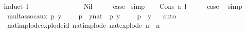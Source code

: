 \begin{isabellebody}
%
\isadelimproof
%
\endisadelimproof
%
\isatagproof
{}\isamarkupfalse%
{\isacharparenleft}{\kern0pt}induct\ {\isacartoucheopen}l{\isacartoucheclose}{\isacharparenright}{\kern0pt}\ \ \ \ \ \ \ \ \ \ \ \ \isanewline
\ \ \isamarkupfalse%
\ Nil\isanewline
\ \ \isamarkupfalse%
\ \isamarkupfalse%
\ {\isacharquery}{\kern0pt}case\ \isamarkupfalse%
{\isacharparenleft}{\kern0pt}simp{\isacharparenright}{\kern0pt}\isanewline
{}\isamarkupfalse%
\isanewline
\ \ \isamarkupfalse%
\ {\isacharparenleft}{\kern0pt}Cons\ a\ l{\isacharparenright}{\kern0pt}\isanewline
\ \ \isamarkupfalse%
\ \isamarkupfalse%
\ {\isacharquery}{\kern0pt}case\ \ \isamarkupfalse%
{\isacharparenleft}{\kern0pt}simp{\isacharparenright}{\kern0pt}\isanewline
{}\isamarkupfalse%
%
\endisatagproof
{\isafoldproof}%
%
\isadelimproof
\ \isanewline
%
\endisadelimproof
\isanewline
{}\isamarkupfalse%
\ mult{\isacharunderscore}{\kern0pt}assoc{\isacharunderscore}{\kern0pt}aux{}{\isacharcolon}{\kern0pt}\ {\isacartoucheopen}{\isacharparenleft}{\kern0pt}{\isasymlambda}{\isacharparenleft}{\kern0pt}p{\isacharcomma}{\kern0pt}\ y{\isacharparenright}{\kern0pt}{\isachardot}{\kern0pt}\ {}{}\ {\isacharasterisk}{\kern0pt}\ {}{}\ {\isacharcircum}{\kern0pt}\ p\ {\isacharasterisk}{\kern0pt}\ {\isacharparenleft}{\kern0pt}y{\isacharcolon}{\kern0pt}{\isacharcolon}{\kern0pt}nat{\isacharparenright}{\kern0pt}{\isacharparenright}{\kern0pt}\ {\isacharequal}{\kern0pt}\ {\isacharparenleft}{\kern0pt}{\isasymlambda}{\isacharparenleft}{\kern0pt}p{\isacharcomma}{\kern0pt}\ y{\isacharparenright}{\kern0pt}{\isachardot}{\kern0pt}\ {}{}\ {\isacharasterisk}{\kern0pt}\ {\isacharparenleft}{\kern0pt}{}{}\ {\isacharcircum}{\kern0pt}\ p\ {\isacharasterisk}{\kern0pt}\ y{\isacharparenright}{\kern0pt}{\isacharparenright}{\kern0pt}{\isacartoucheclose}\isanewline
%
\isadelimproof
\ \ %
\endisadelimproof
%
\isatagproof
{}\isamarkupfalse%
{\isacharparenleft}{\kern0pt}auto{\isacharparenright}{\kern0pt}%
\endisatagproof
{\isafoldproof}%
%
\isadelimproof
\isanewline
%
\endisadelimproof
\isanewline
{}\isamarkupfalse%
\ nat{\isacharunderscore}{\kern0pt}implode{\isacharunderscore}{\kern0pt}explode{\isacharunderscore}{\kern0pt}id{\isacharcolon}{\kern0pt}\ {\isacartoucheopen}nat{\isacharunderscore}{\kern0pt}implode\ {\isacharparenleft}{\kern0pt}nat{\isacharunderscore}{\kern0pt}explode\ n{\isacharparenright}{\kern0pt}\ {\isacharequal}{\kern0pt}\ n{\isacartoucheclose}\isanewline

\end{isabellebody}

